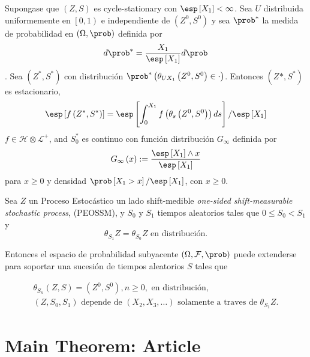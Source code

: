 \begin{Teo}
Supongase que $\left(Z,S\right)$ es cycle-stationary con $\esp\left[X_{1}\right]<\infty$. Sea $U$ distribuida uniformemente en $\left[0,1\right)$ e independiente de $\left(Z^{0},S^{0}\right)$ y sea $\prob^{*}$ la medida de probabilidad en $\left(\Omega,\prob\right)$ definida por $$d\prob^{*}=\frac{X_{1}}{\esp\left[X_{1}\right]}d\prob$$. Sea $\left(Z^{*},S^{*}\right)$ con distribuci\'on $\prob^{*}\left(\theta_{UX_{1}}\left(Z^{0},S^{0}\right)\in\cdot\right)$. Entonces $\left(Z^{}*,S^{*}\right)$ es estacionario,
\begin{eqnarray*}
\esp\left[f\left(Z^{*},S^{*}\right)\right]=\esp\left[\int_{0}^{X_{1}}f\left(\theta_{s}\left(Z^{0},S^{0}\right)\right)ds\right]/\esp\left[X_{1}\right]
\end{eqnarray*}
$f\in\mathcal{H}\otimes\mathcal{L}^{+}$, and $S_{0}^{*}$ es continuo con funci\'on distribuci\'on $G_{\infty}$ definida por $$G_{\infty}\left(x\right):=\frac{\esp\left[X_{1}\right]\wedge x}{\esp\left[X_{1}\right]}$$ para $x\geq0$ y densidad $\prob\left[X_{1}>x\right]/\esp\left[X_{1}\right]$, con $x\geq0$.

\end{Teo}


\begin{Teo}
Sea $Z$ un Proceso Estoc\'astico un lado shift-medible \textit{one-sided shift-measurable stochastic process}, (PEOSSM),
y $S_{0}$ y $S_{1}$ tiempos aleatorios tales que $0\leq S_{0}<S_{1}$ y
\begin{equation}
\theta_{S_{1}}Z=\theta_{S_{0}}Z\textrm{ en distribuci\'on}.
\end{equation}

Entonces el espacio de probabilidad subyacente $\left(\Omega,\mathcal{F},\prob\right)$ puede extenderse para soportar una sucesi\'on de tiempos aleatorios $S$ tales que

\begin{eqnarray}
\theta_{S_{n}}\left(Z,S\right)=\left(Z^{0},S^{0}\right),n\geq0,\textrm{ en distribuci\'on},\\
\left(Z,S_{0},S_{1}\right)\textrm{ depende de }\left(X_{2},X_{3},\ldots\right)\textrm{ solamente a traves de }\theta_{S_{1}}Z.
\end{eqnarray}
\end{Teo}
\section{Main Theorem: Article}

